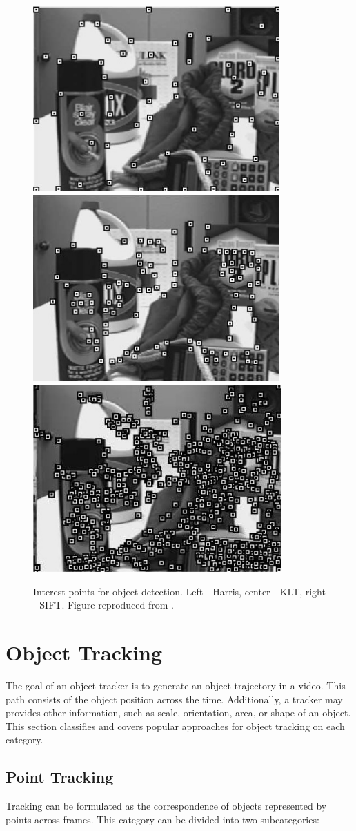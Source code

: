 \begin{figure}[h!!]
\centering
{
\includegraphics[width=0.32\linewidth]{Figures/points/harris.png}
\includegraphics[width=0.32\linewidth]{Figures/points/klt.png}
\includegraphics[width=0.32\linewidth]{Figures/points/sift.png}
}	
\caption[Interest points for object detection]
		{Interest points for object detection. Left - Harris, center - KLT, 
		right - SIFT. Figure reproduced from \cite{Yilmaz2006}.}
\end{figure}

\section{Object Tracking}
\label{sec::tracking}

The goal of an object tracker is to generate an object trajectory in a video.
This path consists of the object position across the time. Additionally,
a tracker may provides other information, such as scale, orientation, area, or
shape of an object. This section classifies and covers popular approaches
for object tracking on each category.

\subsection{Point Tracking}

Tracking can be formulated as the correspondence of objects represented by
points across frames. This category can be divided into two subcategories:

